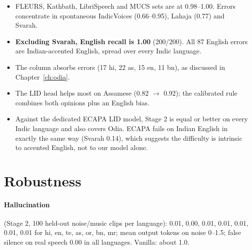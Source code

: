 \begin{itemize}
\item FLEURS, Kathbath, LibriSpeech and MUCS sets are at 0.98--1.00. Errors concentrate in spontaneous IndicVoices (0.66--0.95),
Lahaja (0.77) and Svarah.
\item \textbf{Excluding Svarah, English recall is 1.00} (200/200). All 87 English errors are Indian-accented English, spread over
every Indic language.
\item The  column absorbs errors (17 hi, 22 as, 15 en, 11 bn), as discussed in Chapter~\ref{ch:odia}.
\item The LID head helps most on Assamese (0.82 $\to$ 0.92); the calibrated rule combines both opinions plus an English bias.
\item Against the dedicated ECAPA LID model, Stage 2 is equal or better on every Indic language and also covers Odia. ECAPA fails on
Indian English in exactly the same way (Svarah 0.14), which suggests the difficulty is intrinsic to accented English, not to our
model alone.
\end{itemize}

\section{Robustness}

\paragraph{Hallucination} (Stage 2, 100 held-out noise/music clips per language): 0.01, 0.00, 0.01, 0.01, 0.01, 0.01, 0.01 for
hi, en, te, as, or, bn, mr; mean output tokens on noise 0--1.5; false silence on real speech 0.00 in all languages. Vanilla: about
1.0.

